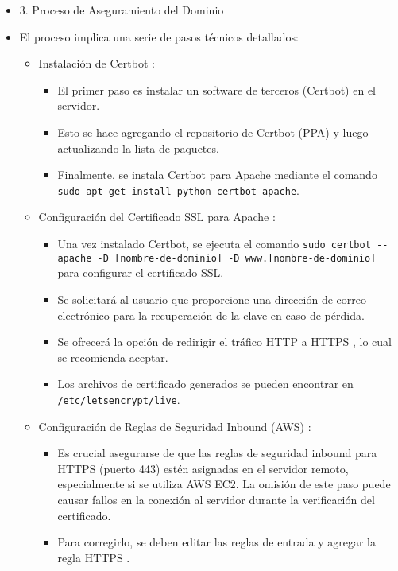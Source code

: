 \documentclass{report}
\begin{document}
\begin{itemize}
    \item 3. Proceso de Aseguramiento del Dominio
    \item El proceso implica una serie de pasos técnicos detallados:
    \begin{itemize}
        \item Instalación de Certbot :
        \begin{itemize}
            \item El primer paso es  instalar un software de terceros  (Certbot) en el servidor.
        \item Esto se hace agregando el repositorio de Certbot (PPA) y luego actualizando la lista de paquetes. 
            \item Finalmente, se instala Certbot para Apache mediante el comando \verb|sudo apt-get install python-certbot-apache|.
        \end{itemize}
        \item Configuración del Certificado SSL para Apache :
        \begin{itemize}
            \item Una vez instalado Certbot, se ejecuta el comando \verb|sudo certbot --apache -D [nombre-de-dominio] -D www.[nombre-de-dominio]| 
            para configurar el certificado SSL.
            \item Se solicitará al usuario que  proporcione una dirección de correo electrónico  para la recuperación de la clave en caso de pérdida.
            \item Se ofrecerá la opción de  redirigir el tráfico HTTP a HTTPS , lo cual se recomienda aceptar.
        \item Los archivos de certificado generados se pueden encontrar en \verb|/etc/letsencrypt/live|.
        \end{itemize}
        \item Configuración de Reglas de Seguridad Inbound (AWS) :
        \begin{itemize}
            \item Es crucial asegurarse de que las  reglas de seguridad inbound para HTTPS (puerto 443)  estén asignadas en el servidor remoto, 
            especialmente si se utiliza AWS EC2. La omisión de este paso puede causar fallos en la conexión al servidor durante la verificación 
            del certificado.
            \item Para corregirlo, se deben editar las reglas de entrada y  agregar la regla HTTPS .        
        \end{itemize}

\end{itemize}
\end{itemize}
\end{document}
